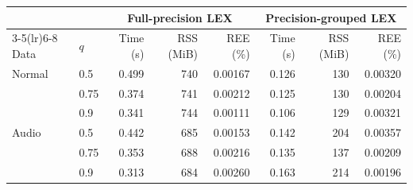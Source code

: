 \begin{tabular}{@{}ll rrr rrr@{}}
\toprule
 &  & \multicolumn{3}{c}{Full-precision LEX} & \multicolumn{3}{c}{Precision-grouped LEX} \\
\cmidrule(lr){3-5}\cmidrule(lr){6-8}
Data & $q$ & Time (s) & RSS (MiB) & REE (\%) & Time (s) & RSS (MiB) & REE (\%) \\
\midrule
Normal & 0.5 & 0.499 & 740 & 0.00167 & 0.126 & 130 & 0.00320 \\
 & 0.75 & 0.374 & 741 & 0.00212 & 0.125 & 130 & 0.00204 \\
 & 0.9 & 0.341 & 744 & 0.00111 & 0.106 & 129 & 0.00321 \\
\addlinespace
Audio & 0.5 & 0.442 & 685 & 0.00153 & 0.142 & 204 & 0.00357 \\
 & 0.75 & 0.353 & 688 & 0.00216 & 0.135 & 137 & 0.00209 \\
 & 0.9 & 0.313 & 684 & 0.00260 & 0.163 & 214 & 0.00196 \\
\bottomrule
\end{tabular}
